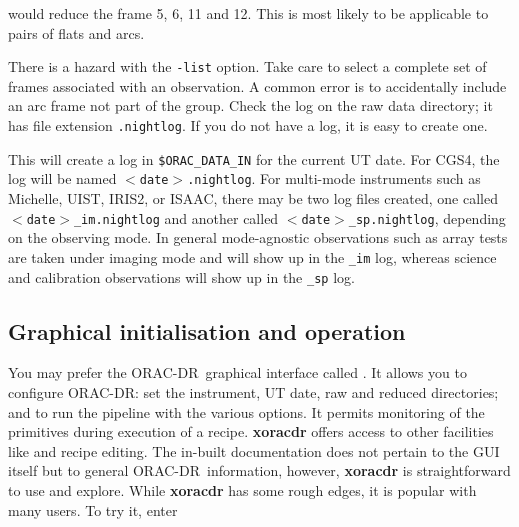 \documentclass[twoside,11pt,nolof]{starlink}
\providecommand{\ORACDR}{{\footnotesize ORAC-DR}}
\begin{document}
\begin{terminalv}
\end{terminalv}
would reduce the frame 5, 6, 11 and 12. This is most likely to
be applicable to pairs of flats and arcs.

There is a hazard with the \texttt{-list} option. Take care to select
a complete set of frames associated with an observation. A common
error is to accidentally include an arc frame not part of the
group. Check the log on the raw data directory; it has file
extension \texttt{.nightlog}. If you do not have a log, it is easy to
create one.
\label{night_log}

\begin{terminalv}
\end{terminalv}
This will create a log in \texttt{\$ORAC\_DATA\_IN} for the current
UT date. For CGS4, the log will be named \texttt{$<$date$>$.nightlog}.
For multi-mode instruments such as Michelle, UIST, IRIS2, or ISAAC,
there may be two log files created, one called \texttt{$<$date$>$\_im.nightlog}
and another called \texttt{$<$date$>$\_sp.nightlog}, depending on the
observing mode. In general mode-agnostic observations such as array
tests are taken under imaging mode and will show up in the
\texttt{\_im} log, whereas science and calibration observations will
show up in the \texttt{\_sp} log.

\subsection{Graphical initialisation and
operation\label{graphical_initialisation_and_operation}}

You may prefer the \ORACDR\ graphical interface called
.
  It allows you to configure
ORAC-DR: set the instrument, UT date, raw and reduced directories; and
to run the pipeline with the various options.  It permits monitoring
of the primitives during execution of a recipe. \textbf{xoracdr} offers
access to other facilities like
 and recipe editing.  The in-built
documentation does not pertain to the GUI itself but to general
\ORACDR\ information, however, \textbf{xoracdr} is straightforward to use
and explore.  While \textbf{xoracdr} has some rough edges, it is popular
with many users.  To try it, enter

\begin{terminalv}
\end{terminalv}
\end{document}
